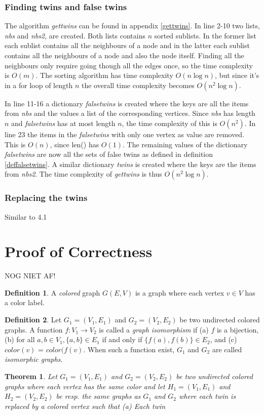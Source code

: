 \documentclass[twoside]{article}
\theoremstyle{definition}
\newtheorem{definition}{Definition}
\theoremstyle{plain}
\newtheorem{theorem}{Theorem}
\begin{document}
\begin{multicols}{2}
\subsubsection{Finding twins and false twins}
The algorithm \emph{gettwins} can be found in appendix \ref{gettwins}. In line 2-10 two lists, \emph{nbs} and \emph{nbs2}, are created. Both lists contains $n$ sorted sublists. In the former list each sublist contains all the neighbours of a node and in the latter each sublist contains all the neighbours of a node and also the node itself. Finding all the neighbours only require going though all the edges once, so the time complexity is $O(m)$. The sorting algorithm has time complexity $O(n \log n)$, but since it's in a for loop of length $n$ the overall time complexity becomes $O(n^2 \log n)$. 

In line 11-16 a dictionary \emph{falsetwins} is created where the keys are all the items from \emph{nbs} and the values a list of the corresponding vertices. Since \emph{nbs} has length $n$ and \emph{falsetwins} has at most length $n$, the time complexity of this is $O(n^2)$. In line 23 the items in the \emph{falsetwins} with only one vertex as value are removed. This is $O(n)$, since len() has $O(1)$.\cite{website:pythonTimeComplexity} The remaining values of the dictionary \emph{falsetwins} are now all the sets of false twins as defined in definition \ref{deffalsetwins}. A similar dictionary \emph{twins} is created where the keys are the items from \emph{nbs2}. The time complexity of \textit{gettwins} is thus $O(n^2 \log n)$.


\subsubsection{Replacing the twins}
Similar to 4.1

\section{Proof of Correctness}
NOG NIET AF!
\begin{definition}
A \emph{colored} graph $G(E,V)$ is a graph where each vertex $v \in V$ has a color label.
\end{definition}
\begin{definition}
Let $G_1 = (V_1, E_1)$ and $G_2 = (V_2, E_2)$ be two undirected colored graphs. A function $f: V_1 \to V_2$ is called a \emph{graph isomorphism} if (a) $f$ is a bijection, (b) for all $a, b \in V_1, \{a, b\} \in E_1$ if and only if $\{f(a), f(b)\} \in E_2$, and (c) $color(v)$ = $color (f(v)$. When such a function exist, $G_1$ and $G_2$ are called \emph{isomorphic graphs}. 
\end{definition}
\begin{theorem}
Let $G_1 = (V_1, E_1)$ and $G_2 = (V_2, E_2)$ be two undirected colored graphs where each vertex has the same color and let $H_1 = (V_1, E_1)$ and $H_2 = (V_2, E_2)$ be resp. the same graphs as $G_1$ and $G_2$ where each twin is replaced by a colored vertex such that (a) Each twin
\end{theorem}


\end{multicols}
\end{document}
